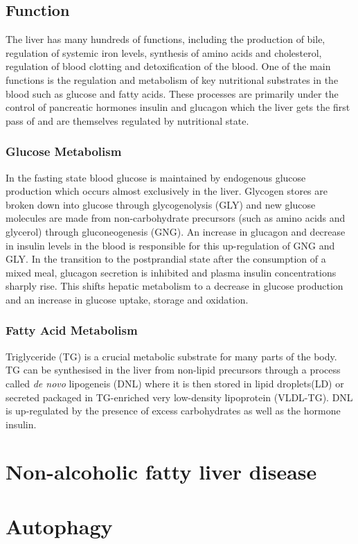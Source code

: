 \subsection{Function}

The liver has many hundreds of functions, including the production of bile, regulation of systemic iron levels, synthesis of amino acids and cholesterol, regulation of blood clotting and detoxification of the blood. One of the main functions is the regulation and metabolism of key nutritional substrates in the blood such as glucose and fatty acids. These processes are primarily under the control of pancreatic hormones insulin and glucagon which the liver gets the first pass of and are themselves regulated by nutritional state.  

\subsubsection{Glucose Metabolism}

In the fasting state blood glucose is maintained by endogenous glucose production which occurs almost exclusively in the liver. Glycogen stores are broken down into glucose through glycogenolysis (GLY) and new glucose molecules are made from non-carbohydrate precursors (such as amino acids and glycerol) through gluconeogenesis (GNG). An increase in glucagon and decrease in insulin levels in the blood is responsible for this up-regulation of GNG and GLY. In the transition to the postprandial state after the consumption of a mixed meal, glucagon secretion is inhibited and plasma insulin concentrations sharply rise. This shifts hepatic metabolism to a decrease in glucose production and an increase in glucose uptake, storage and oxidation. 

\subsubsection{Fatty Acid Metabolism}


Triglyceride (TG) is a crucial metabolic substrate for many parts of the body. TG can be synthesised in the liver from non-lipid precursors through a process called \textit{de novo} lipogeneis (DNL) where it is then stored in lipid droplets(LD) or secreted packaged in TG-enriched very low-density lipoprotein (VLDL-TG). DNL is up-regulated by the presence of excess carbohydrates as well as the hormone insulin. 

\section{Non-alcoholic fatty liver disease}

\section{Autophagy}